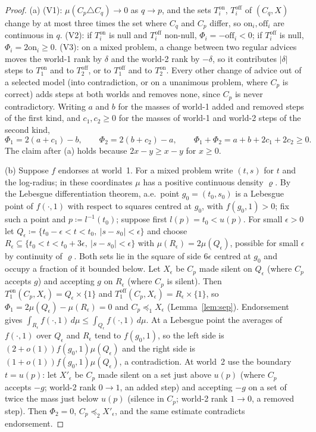 \documentclass[11pt]{article}
\theoremstyle{definition}\newtheorem{definition}[theorem]{Definition}
\theoremstyle{remark}\newtheorem{remark}[theorem]{Remark}
\newcommand{\on}{\mathrm{on}}
\newcommand{\off}{\mathrm{off}}
\begin{document}
\begin{proof}
(a) (V1): $\mu(C_p\triangle C_q)\to0$ as $q\to p$, and the sets $T^\on_i$,
$T^\off_i$ of $(C_q,X)$ change by at most three times the set where $C_q$ and
$C_p$ differ, so $\on_i,\off_i$ are continuous in $q$.
(V2): if $T^\on_i$ is null and $T^\off_i$ non-null, $\Phi_i=-\off_i<0$; if
$T^\off_i$ is null, $\Phi_i=2\on_i\ge0$.
(V3): on a mixed problem, a change between two regular advices moves the
world-1 rank by $\delta$ and the world-2 rank by $-\delta$, so it contributes
$|\delta|$ steps to $T^\on_1$ and to $T^\off_2$, or to $T^\off_1$ and to
$T^\on_2$. Every other change of advice out of a selected model (into
contradiction, or on a unanimous problem, where $C_p$ is correct) adds steps
at both worlds and removes none, since $C_p$ is never contradictory. Writing
$a$ and $b$ for the masses of world-1 added and removed steps of the first
kind, and $c_1,c_2\ge0$ for the masses of world-1 and world-2 steps of the
second kind,
\[
 \Phi_1=2(a+c_1)-b,\qquad\Phi_2=2(b+c_2)-a,\qquad\Phi_1+\Phi_2=a+b+2c_1+2c_2\ge0 .
\]
The claim after (a) holds because $2x-y\ge x-y$ for $x\ge0$.

(b) Suppose $f$ endorses at world~1. For a mixed problem write $(t,s)$ for
$t$ and the log-radius; in these coordinates $\mu$ has a positive continuous
density $\varrho$. By the Lebesgue differentiation theorem, a.e.\ point
$g_0=(t_0,s_0)$ is a Lebesgue point of $f(\cdot,1)$ with respect to squares
centred at $g_0$, with $f(g_0,1)>0$; fix such a point and
$p\coloneqq l^{-1}(t_0)$; suppose first $l(p)=t_0<u(p)$. For small $\epsilon>0$ let
$Q_\epsilon\coloneqq\{t_0-\epsilon<t<t_0,\ |s-s_0|<\epsilon\}$ and choose
$R_\epsilon\subseteq\{t_0<t<t_0+3\epsilon,\ |s-s_0|<\epsilon\}$ with
$\mu(R_\epsilon)=2\mu(Q_\epsilon)$, possible for small $\epsilon$ by continuity
of $\varrho$. Both sets lie in the square of side $6\epsilon$ centred at $g_0$
and occupy a fraction of it bounded below. Let $X_\epsilon$ be $C_p$ made
silent on $Q_\epsilon$ (where $C_p$ accepts $g$) and accepting $g$ on
$R_\epsilon$ (where $C_p$ is silent). Then
$T^\on_1(C_p,X_\epsilon)=Q_\epsilon\times\{1\}$ and
$T^\off_1(C_p,X_\epsilon)=R_\epsilon\times\{1\}$, so
$\Phi_1=2\mu(Q_\epsilon)-\mu(R_\epsilon)=0$ and $C_p\preceq_1X_\epsilon$
(Lemma~\ref{lem:sep}). Endorsement gives
$\int_{R_\epsilon}f(\cdot,1)\,d\mu\le\int_{Q_\epsilon}f(\cdot,1)\,d\mu$. At a
Lebesgue point the averages of $f(\cdot,1)$ over $Q_\epsilon$ and $R_\epsilon$
tend to $f(g_0,1)$, so the left side is $(2+o(1))f(g_0,1)\mu(Q_\epsilon)$ and
the right side is $(1+o(1))f(g_0,1)\mu(Q_\epsilon)$, a contradiction. At
world~2 use the boundary $t=u(p)$: let $X'_\epsilon$ be $C_p$ made silent on a
set just above $u(p)$ (where $C_p$ accepts $-g$; world-2 rank $0\to1$, an
added step) and accepting $-g$ on a set of twice the mass just below $u(p)$
(silence in $C_p$; world-2 rank $1\to0$, a removed step). Then $\Phi_2=0$,
$C_p\preceq_2X'_\epsilon$, and the same estimate contradicts endorsement.


\end{proof}
\end{document}
